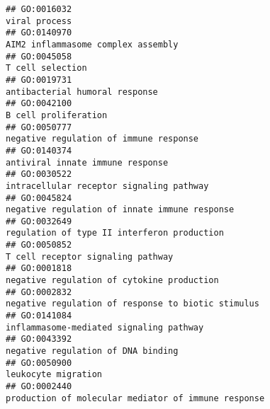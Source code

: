 \documentclass[
]{article}
\begin{document}
\begin{verbatim}
## GO:0016032                                                                                                                                    viral process
## GO:0140970                                                                                                               AIM2 inflammasome complex assembly
## GO:0045058                                                                                                                                 T cell selection
## GO:0019731                                                                                                                   antibacterial humoral response
## GO:0042100                                                                                                                             B cell proliferation
## GO:0050777                                                                                                           negative regulation of immune response
## GO:0140374                                                                                                                 antiviral innate immune response
## GO:0030522                                                                                                         intracellular receptor signaling pathway
## GO:0045824                                                                                                    negative regulation of innate immune response
## GO:0032649                                                                                                      regulation of type II interferon production
## GO:0050852                                                                                                                T cell receptor signaling pathway
## GO:0001818                                                                                                       negative regulation of cytokine production
## GO:0002832                                                                                               negative regulation of response to biotic stimulus
## GO:0141084                                                                                                          inflammasome-mediated signaling pathway
## GO:0043392                                                                                                               negative regulation of DNA binding
## GO:0050900                                                                                                                              leukocyte migration
## GO:0002440                                                                                              production of molecular mediator of immune response

\end{verbatim}
\end{document}
